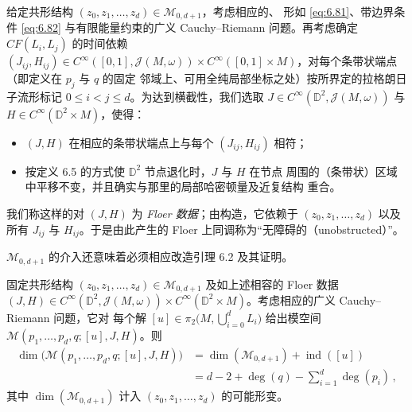 \begin{Def}\label{def:6.9}
给定共形结构 $(z_0,z_1,\dots,z_d)\in\mathcal M_{0,d+1}$，考虑相应的、
形如 \eqref{eq:6.81}、带边界条件 \eqref{eq:6.82} 与有限能量约束的广义
Cauchy--Riemann 问题。再考虑确定 $CF(L_i,L_j)$ 的时间依赖
$(J_{ij},H_{ij})\in C^\infty([0,1],\mathcal J(M,\omega))\times
C^\infty([0,1]\times M)$，对每个条带状端点（即定义在 $p_j$ 与 $q$ 的固定
邻域上、可用全纯局部坐标之处）按所界定的拉格朗日子流形标记
$0\le i<j\le d$。为达到横截性，我们选取
$J\in C^\infty(\mathbb D^2,\mathcal J(M,\omega))$ 与
$H\in C^\infty(\mathbb D^2\times M)$，使得：
\begin{itemize}
  \item $(J,H)$ 在相应的条带状端点上与每个 $(J_{ij},H_{ij})$ 相符；
  \item 按定义 6.5 的方式使 $\mathbb D^2$ 节点退化时，$J$ 与 $H$ 在节点
  周围的（条带状）区域中平移不变，并且确实与那里的局部哈密顿量及近复结构
  重合。
\end{itemize}
我们称这样的对 $(J,H)$ 为 \emph{Floer 数据}；由构造，它依赖于
$(z_0,z_1,\dots,z_d)$ 以及所有 $J_{ij}$ 与 $H_{ij}$。于是由此产生的 Floer
上同调称为“无障碍的（unobstructed）”。
\end{Def}


$\mathcal M_{0,d+1}$ 的介入还意味着必须相应改造引理 6.2 及其证明。

\begin{Lem}\label{lem:6.10}
固定共形结构 $(z_0,z_1,\dots,z_d)\in\mathcal M_{0,d+1}$ 及如上述相容的
Floer 数据 $(J,H)\in C^\infty(\mathbb D^2,\mathcal J(M,\omega))\times
C^\infty(\mathbb D^2\times M)$。考虑相应的广义 Cauchy--Riemann 问题，它对
每个解 $[u]\in\pi_2\bigl(M,\bigcup_{i=0}^d L_i\bigr)$ 给出模空间
$\mathcal M(p_1,\dots,p_d,q;[u],J,H)$。则
\begin{equation}
\begin{aligned}
\dim\bigl(\mathcal M(p_1,\dots,p_d,q;[u],J,H)\bigr)
&=\dim(\mathcal M_{0,d+1})+\operatorname{ind}([u])\\
&=d-2+\deg(q)-\sum_{i=1}^{d}\deg(p_i)\,,
\end{aligned}
\label{eq:6.83}
\end{equation}
其中 $\dim(\mathcal M_{0,d+1})$ 计入 $(z_0,z_1,\dots,z_d)$ 的可能形变。
\end{Lem}

